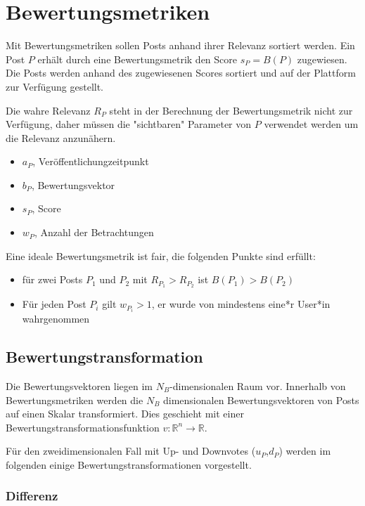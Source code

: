 \chapter{Bewertungsmetriken}
\label{chapter:bewertungsmetriken}


Mit Bewertungsmetriken sollen Posts anhand ihrer Relevanz sortiert werden. Ein Post $P$ erhält durch eine Bewertungsmetrik den Score $s_P = B(P)$ zugewiesen. Die Posts werden anhand des zugewiesenen Scores sortiert und auf der Plattform zur Verfügung gestellt.

 Die wahre Relevanz $R_P$ steht in der Berechnung der Bewertungsmetrik nicht zur Verfügung, daher müssen die "sichtbaren" Parameter von $P$ verwendet werden um die Relevanz anzunähern.

\begin{itemize}
	\item $a_P$, Veröffentlichungzeitpunkt
	\item $b_P$, Bewertungsvektor
	\item $s_P$, Score
	\item $w_P$, Anzahl der Betrachtungen
\end{itemize}

Eine ideale Bewertungsmetrik ist fair, die folgenden Punkte sind erfüllt:

\begin{itemize}
	\item für zwei Posts $P_1$ und $P_2$ mit $R_{P_1} > R_{P_2}$ ist $B(P_1) > B(P_2)$
	\item Für jeden Post $P_i$ gilt $w_{P_i} > 1$, er wurde von mindestens eine*r User*in wahrgenommen
\end{itemize}

\section{Bewertungstransformation}
\label{voteevaluation}

Die Bewertungsvektoren liegen im $N_B$-dimensionalen Raum vor. Innerhalb von Bewertungsmetriken werden die $N_B$ dimensionalen Bewertungsvektoren von Posts auf einen Skalar transformiert. Dies geschieht mit einer Bewertungstransformationsfunktion $v: \mathbb{R}^{n} \rightarrow \mathbb{R}$.


Für den zweidimensionalen Fall mit Up- und Downvotes ($u_P$,$d_P$) werden im folgenden einige Bewertungstransformationen vorgestellt.

\subsection{Differenz}

